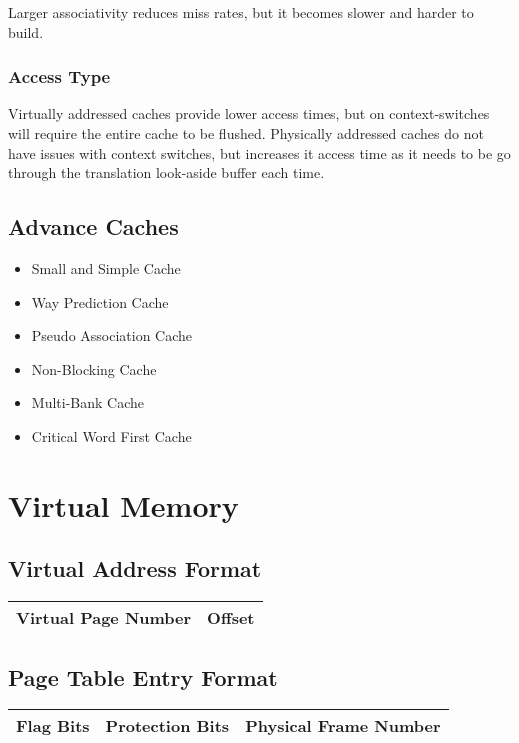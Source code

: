 \documentclass[11pt]{article}
\begin{document}
Larger associativity reduces miss rates, but it becomes slower and harder to build.

\subsubsection{Access Type}

Virtually addressed caches provide lower access times, but on context-switches will require the entire cache to be flushed. Physically addressed caches do not have issues with context switches, but increases it access time as it needs to be go through the translation look-aside buffer each time.

\subsection{Advance Caches}

\begin{itemize}
	\item Small and Simple Cache
	\item Way Prediction Cache
	\item Pseudo Association Cache
	\item Non-Blocking Cache
	\item Multi-Bank Cache
	\item Critical Word First Cache
\end{itemize}

\section{Virtual Memory}

\subsection{Virtual Address Format}

\begin{table}[H]
	\centering
	\begin{tabular}{| c | c |}
		\hline
		Virtual Page Number	&	Offset\\
		\hline
	\end{tabular}
\end{table}

\subsection{Page Table Entry Format}

\begin{table}[H]
	\centering
	\begin{tabular}{| c | c | c |}
		\hline
		Flag Bits	&	Protection Bits	&	Physical Frame Number\\
		\hline
	\end{tabular}
\end{table}
\end{document}
